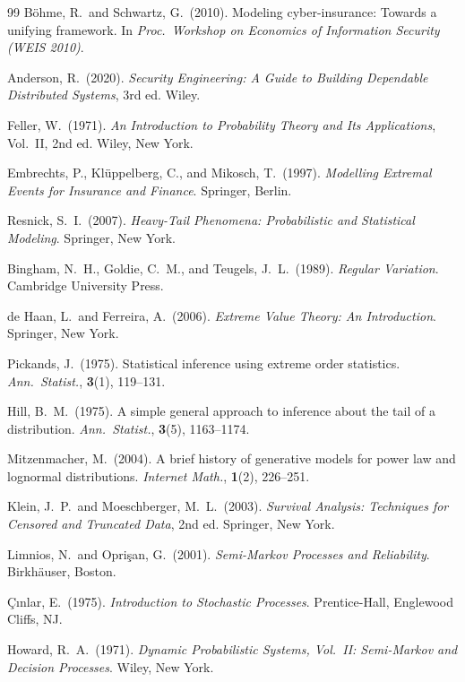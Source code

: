 \documentclass[12pt,a4paper]{article}
\theoremstyle{plain}
\theoremstyle{definition}
\theoremstyle{remark}
\begin{document}
\begin{thebibliography}{99}
B{\"o}hme, R.\ and Schwartz, G.\ (2010).
Modeling cyber-insurance: Towards a unifying framework.
In \textit{Proc.\ Workshop on Economics of Information Security (WEIS 2010)}.

Anderson, R.\ (2020).
\textit{Security Engineering: A Guide to Building Dependable Distributed Systems},
3rd ed.
Wiley.

Feller, W.\ (1971).
\textit{An Introduction to Probability Theory and Its Applications},
Vol.~II, 2nd ed.
Wiley, New York.

Embrechts, P., Kl{\"u}ppelberg, C., and Mikosch, T.\ (1997).
\textit{Modelling Extremal Events for Insurance and Finance}.
Springer, Berlin.

Resnick, S.\ I.\ (2007).
\textit{Heavy-Tail Phenomena: Probabilistic and Statistical Modeling}.
Springer, New York.

Bingham, N.\ H., Goldie, C.\ M., and Teugels, J.\ L.\ (1989).
\textit{Regular Variation}.
Cambridge University Press.

de Haan, L.\ and Ferreira, A.\ (2006).
\textit{Extreme Value Theory: An Introduction}.
Springer, New York.

Pickands, J.\ (1975).
Statistical inference using extreme order statistics.
\textit{Ann.\ Statist.}, \textbf{3}(1), 119--131.

Hill, B.\ M.\ (1975).
A simple general approach to inference about the tail of a distribution.
\textit{Ann.\ Statist.}, \textbf{3}(5), 1163--1174.

Mitzenmacher, M.\ (2004).
A brief history of generative models for power law and lognormal distributions.
\textit{Internet Math.}, \textbf{1}(2), 226--251.

Klein, J.\ P.\ and Moeschberger, M.\ L.\ (2003).
\textit{Survival Analysis: Techniques for Censored and Truncated Data},
2nd ed.
Springer, New York.

Limnios, N.\ and Opri\c{s}an, G.\ (2001).
\textit{Semi-Markov Processes and Reliability}.
Birkh{\"a}user, Boston.

{\c C}{\i}nlar, E.\ (1975).
\textit{Introduction to Stochastic Processes}.
Prentice-Hall, Englewood Cliffs, NJ.

Howard, R.\ A.\ (1971).
\textit{Dynamic Probabilistic Systems, Vol.~II: Semi-Markov and Decision Processes}.
Wiley, New York.


\end{thebibliography}
\end{document}
